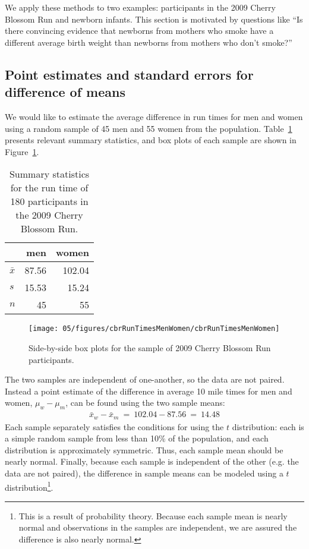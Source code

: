 We apply these methods to two examples: participants in the 2009 Cherry Blossom Run and newborn infants. This section is motivated by questions like ``Is there convincing evidence that newborns from mothers who smoke have a different average birth weight than newborns from mothers who don't smoke?''

\subsection{Point estimates and standard errors for difference of means}

We would like to estimate the average difference in run times for men and women using a random sample of 45 men and 55 women from the  population. Table~\ref{cherryBlossomRun2009SampleOf180SummaryStats} presents relevant summary statistics, and box plots of each sample are shown in Figure~\ref{cbrRunTimesMenWomen}.

\begin{table}[h]
\centering
\begin{tabular}{l rr}
\hline
	&	men	&	women \\
\hline
$\bar{x}$	& 87.56	& 102.04 \\
$s$	&	15.53	& 15.24 \\
$n$	&	45		& 55    \\
\hline
\end{tabular}
\caption{Summary statistics for the run time of 180 participants in the 2009 Cherry Blossom Run.}
\label{cherryBlossomRun2009SampleOf180SummaryStats}
\end{table}

\begin{figure}
\centering
\texttt{[image: 05/figures/cbrRunTimesMenWomen/cbrRunTimesMenWomen]}
\caption{Side-by-side box plots for the sample of 2009 Cherry Blossom Run participants.}
\label{cbrRunTimesMenWomen}
\end{figure}

The two samples are independent of one-another, so the data are not paired. Instead a point estimate of the difference in average 10 mile times for men and women, $\mu_w - \mu_m$, can be found using the two sample means:
\begin{eqnarray*}
\bar{x}_{w} - \bar{x}_{m}\ =\ 102.04 - 87.56\ =\ 14.48
\end{eqnarray*}
Each sample separately satisfies the conditions for using the $t$ distribution: each is a simple random sample from less than 10\% of the population, and each distribution is approximately symmetric. Thus, each sample mean should be nearly normal. Finally, because each sample is independent of the other (e.g. the data are not paired), the difference in sample means can be modeled using a $t$ distribution\footnote{This is a result of probability theory. Because each sample mean is nearly normal and observations in the samples are independent, we are assured the difference is also nearly normal.}.

